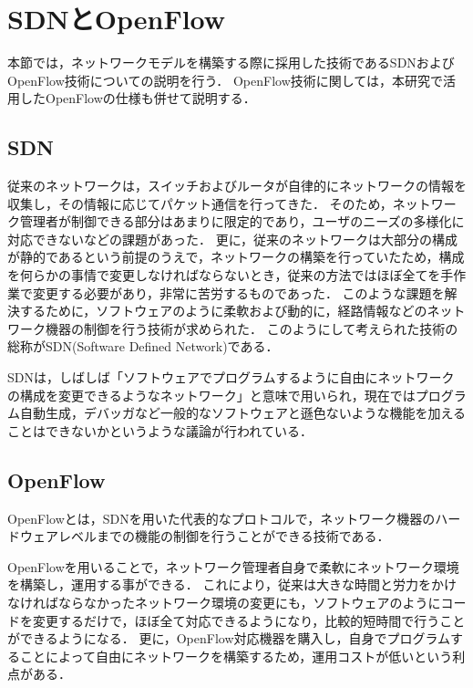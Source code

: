 \section{SDNとOpenFlow}

本節では，ネットワークモデルを構築する際に採用した技術であるSDNおよびOpenFlow技術についての説明を行う．
OpenFlow技術に関しては，本研究で活用したOpenFlowの仕様も併せて説明する．

\subsection{SDN}

従来のネットワークは，スイッチおよびルータが自律的にネットワークの情報を収集し，その情報に応じてパケット通信を行ってきた\cite{openflownet}．
そのため，ネットワーク管理者が制御できる部分はあまりに限定的であり，ユーザのニーズの多様化に対応できないなどの課題があった．
更に，従来のネットワークは大部分の構成が静的であるという前提のうえで，ネットワークの構築を行っていたため，構成を何らかの事情で変更しなければならないとき，従来の方法ではほぼ全てを手作業で変更する必要があり，非常に苦労するものであった．
このような課題を解決するために，ソフトウェアのように柔軟および動的に，経路情報などのネットワーク機器の制御を行う技術が求められた．
このようにして考えられた技術の総称がSDN(Software Defined Network)である．

SDNは，しばしば「ソフトウェアでプログラムするように自由にネットワークの構成を変更できるようなネットワーク」と意味で用いられ\cite{openflowjapanese}，現在ではプログラム自動生成，デバッガなど一般的なソフトウェアと遜色ないような機能を加えることはできないかというような議論が行われている．

\subsection{OpenFlow}

OpenFlowとは，SDNを用いた代表的なプロトコルで，ネットワーク機器のハードウェアレベルまでの機能の制御を行うことができる技術である\cite{openflowjapanese}．

OpenFlowを用いることで，ネットワーク管理者自身で柔軟にネットワーク環境を構築し，運用する事ができる．
これにより，従来は大きな時間と労力をかけなければならなかったネットワーク環境の変更にも，ソフトウェアのようにコードを変更するだけで，ほぼ全て対応できるようになり，比較的短時間で行うことができるようになる．
更に，OpenFlow対応機器を購入し，自身でプログラムすることによって自由にネットワークを構築するため，運用コストが低いという利点がある．

